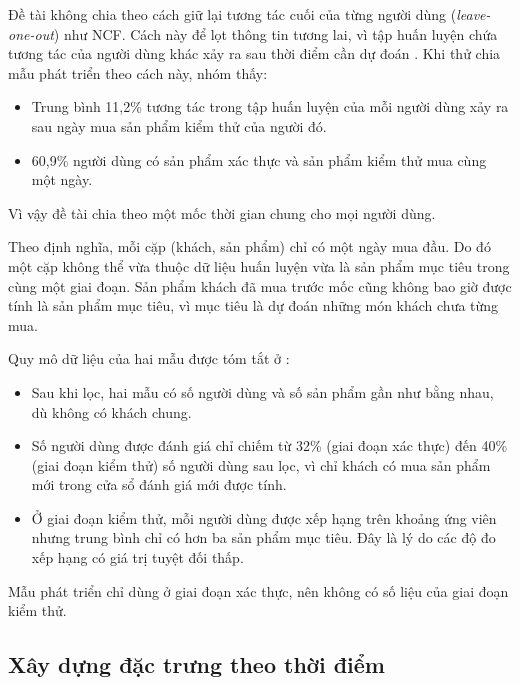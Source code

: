Đề tài không chia theo cách giữ lại tương tác cuối của từng người dùng (\textit{leave-one-out}) như NCF. Cách này để lọt thông tin tương lai, vì tập huấn luyện chứa tương tác của người dùng khác xảy ra sau thời điểm cần dự đoán \parencite{meng2020splitting}. Khi thử chia mẫu phát triển theo cách này, nhóm thấy:
\begin{itemize}
    \item Trung bình 11,2\% tương tác trong tập huấn luyện của mỗi người dùng xảy ra sau ngày mua sản phẩm kiểm thử của người đó.
    \item 60,9\% người dùng có sản phẩm xác thực và sản phẩm kiểm thử mua cùng một ngày.
\end{itemize}

Vì vậy đề tài chia theo một mốc thời gian chung cho mọi người dùng.

Theo định nghĩa, mỗi cặp (khách, sản phẩm) chỉ có một ngày mua đầu. Do đó một cặp không thể vừa thuộc dữ liệu huấn luyện vừa là sản phẩm mục tiêu trong cùng một giai đoạn. Sản phẩm khách đã mua trước mốc cũng không bao giờ được tính là sản phẩm mục tiêu, vì mục tiêu là dự đoán những món khách chưa từng mua.

Quy mô dữ liệu của hai mẫu được tóm tắt ở :
\begin{itemize}
    \item Sau khi lọc, hai mẫu có số người dùng và số sản phẩm gần như bằng nhau, dù không có khách chung.
    \item Số người dùng được đánh giá chỉ chiếm từ 32\% (giai đoạn xác thực) đến 40\% (giai đoạn kiểm thử) số người dùng sau lọc, vì chỉ khách có mua sản phẩm mới trong cửa sổ đánh giá mới được tính.
    \item Ở giai đoạn kiểm thử, mỗi người dùng được xếp hạng trên khoảng  ứng viên nhưng trung bình chỉ có hơn ba sản phẩm mục tiêu. Đây là lý do các độ đo xếp hạng có giá trị tuyệt đối thấp.
\end{itemize}

Mẫu phát triển chỉ dùng ở giai đoạn xác thực, nên không có số liệu của giai đoạn kiểm thử.


\subsection{Xây dựng đặc trưng theo thời điểm}
\label{subsec:features}

